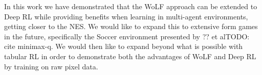 \documentclass[conference]{IEEEtran}
\newcommand\TODO[1]{{\color{red}TODO: #1}}
\begin{document}
In this work we have demonstrated that the WoLF approach can be extended to Deep RL while providing benefits when learning in multi-agent environments, getting closer to the NES. We would like to expand this to extensive form games in the future, specifically the Soccer environment presented by ?? et al\TODO{cite minimax-q}. We would then like to expand beyond what is possible with tabular RL in order to demonstrate both the advantages of WoLF and Deep RL by training on raw pixel data.



\end{document}
